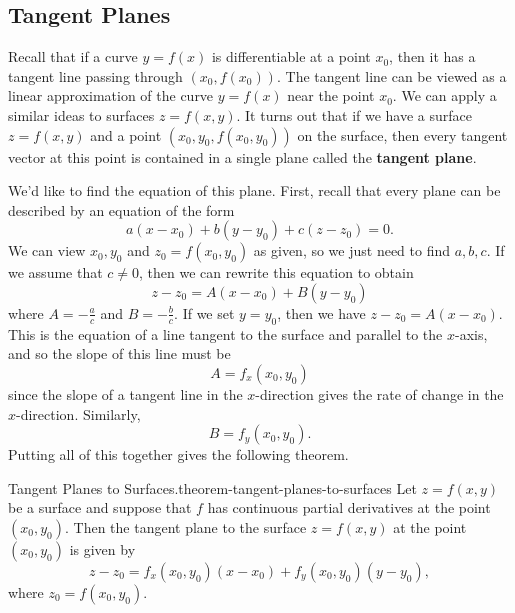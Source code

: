 \documentclass[10pt,]{book}
\newcommand{\terminology}[1]{\textbf{#1}}
\numberwithin{equation}{section}
\begin{document}
\subsection[{Tangent Planes}]{Tangent Planes}\label{subsection-tangent-planes}
\hypertarget{p-1370}{}%
Recall that if a curve \(y=f(x)\) is differentiable at a point \(x_{0}\), then it has a tangent line passing through \((x_{0},f(x_{0})).\) The tangent line can be viewed as a linear approximation of the curve \(y=f(x)\) near the point \(x_{0}\). We can apply a similar ideas to surfaces \(z = f(x,y)\). It turns out that if we have a surface \(z = f(x,y)\) and a point \((x_{0},y_{0}, f(x_{0},y_{0}))\) on the surface, then every tangent vector at this point is contained in a single plane called the \terminology{tangent plane}.%
\par
\hypertarget{p-1371}{}%
We'd like to find the equation of this plane. First, recall that every plane can be described by an equation of the form%
\begin{equation*}
a(x-x_{0})+b(y-y_{0})+c(z-z_{0}) = 0.
\end{equation*}
We can view \(x_{0},y_{0}\) and \(z_{0} = f(x_{0},y_{0})\) as given, so we just need to find \(a,b,c\). If we assume that \(c\neq 0\), then we can rewrite this equation to obtain%
\begin{equation*}
z-z_{0} = A(x-x_{0}) + B(y-y_{0})
\end{equation*}
where \(A = -\frac{a}{c}\) and \(B = -\frac{b}{c}\). If we set \(y=y_{0}\), then we have \(z-z_{0} = A(x-x_{0})\). This is the equation of a line tangent to the surface and parallel to the \(x\)-axis, and so the slope of this line must be%
\begin{equation*}
A = f_{x}(x_{0},y_{0})
\end{equation*}
since the slope of a tangent line in the \(x\)-direction gives the rate of change in the \(x\)-direction. Similarly,%
\begin{equation*}
B = f_{y}(x_{0},y_{0}).
\end{equation*}
Putting all of this together gives the following theorem.%
\begin{theorem}{Tangent Planes to Surfaces.}{}{theorem-tangent-planes-to-surfaces}%
\hypertarget{p-1372}{}%
Let \(z = f(x,y)\) be a surface and suppose that \(f\) has continuous partial derivatives at the point \((x_{0},y_{0})\). Then the tangent plane to the surface \(z = f(x,y)\) at the point \((x_{0},y_{0})\) is given by%
\begin{equation*}
z - z_{0} = f_{x}(x_{0},y_{0})(x - x_{0}) + f_{y}(x_{0},y_{0})(y - y_{0}),
\end{equation*}
where \(z_{0} = f(x_{0},y_{0})\).%
\end{theorem}
\end{document}
